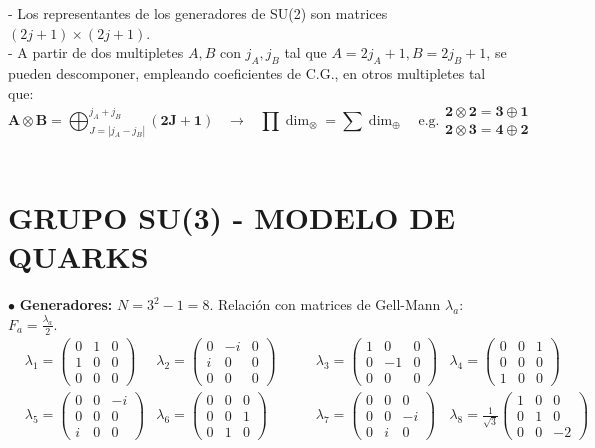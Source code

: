 - Los representantes de los generadores de SU(2) son matrices $(2j+1)\times (2j+1)$.\\
- A partir de dos multipletes $A, B$ con $j_A, j_B$ tal que $A= 2j_A+1, B=2j_B+1$,
se pueden descomponer, empleando coeficientes de C.G., en otros multipletes tal que: $$\mathbf{A} \otimes \mathbf{B} = \bigoplus_{J=|j_A - j_B|}^{j_A + j_B} \mathbf{(2J+1)} \;\;\; \rightarrow \;\;\; \prod \dim_{\otimes} = \sum \dim_{\oplus} \quad \text{e.g.}
\begin{array}{cc}
     \textbf{2} \otimes \textbf{2} = \textbf{3}\oplus \textbf{1}  \\
     \textbf{2}\otimes \textbf{3} = \textbf{4} \oplus \textbf{2}
\end{array}$$\\


\hypertarget{su3}{\section{GRUPO SU(3) - MODELO DE QUARKS}}
$\bullet$ \textbf{Generadores:} $N = 3^2 - 1 = 8$. Relación con matrices de Gell-Mann $\lambda_a$: $F_a = \frac{\lambda_a}{2}$.\\
\begin{align*}
&\lambda_1 = \left(\begin{smallmatrix}0&1&0\\1&0&0\\0&0&0\end{smallmatrix}\right)&\lambda_2 = \left(\begin{smallmatrix}0&-i&0\\i&0&0\\0&0&0\end{smallmatrix}\right)&\qquad\lambda_3 = \left(\begin{smallmatrix}1&0&0\\0&-1&0\\0&0&0\end{smallmatrix}\right)&\lambda_4 = \left(\begin{smallmatrix}0&0&1\\0&0&0\\1&0&0\end{smallmatrix}\right)\\
&\lambda_5 = \left(\begin{smallmatrix}0&0&-i\\0&0&0\\i&0&0\end{smallmatrix}\right)&\lambda_6 = \left(\begin{smallmatrix}0&0&0\\0&0&1\\0&1&0\end{smallmatrix}\right)&\qquad \lambda_7 = \left(\begin{smallmatrix}0&0&0\\0&0&-i\\0&i&0\end{smallmatrix}\right)&\lambda_8 = \frac{1}{\sqrt{3}}\left(\begin{smallmatrix}1&0&0\\0&1&0\\0&0&-2\end{smallmatrix}\right)
\end{align*}


